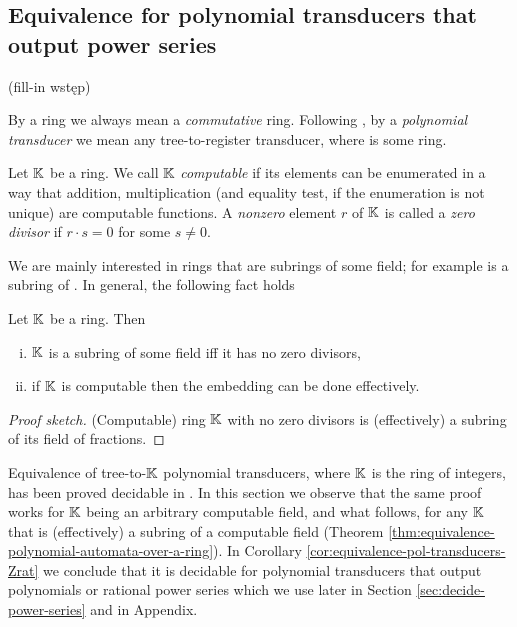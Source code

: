 \subsection{Equivalence for polynomial transducers that output power series}\label{sec:pol-transducers-any-ring}
(fill-in wstęp)

By a ring we always mean a \emph{commutative} ring.  Following \cite{seidlManethKemper2018}, by a \emph{polynomial transducer} we mean any tree-to-\Ring register transducer, where \Ring is some ring.

Let ${\mathbb K}$ be a ring. We call ${\mathbb K}$ \emph{computable} if its elements can be enumerated in a way that addition, multiplication (and equality test, if the enumeration is not unique) are computable functions. A \emph{nonzero} element $r$ of ${\mathbb K}$ is called a \emph{zero divisor} if $r \cdot s = 0$ for some $s \neq 0$.

We are mainly interested in rings that are subrings of some field;
for example \Z is a subring of \Q. In general, the following fact holds
\begin{lemma}\label{lem:ring-with-no-zero-divisors-subring-of-a-field}
	Let ${\mathbb K}$ be a ring. Then
	\begin{enumerate}[(i)]
		\item ${\mathbb K}$ is a subring of some field iff it has no zero divisors,
		\item if ${\mathbb K}$ is computable then the embedding can be done effectively.
	\end{enumerate}
\end{lemma}
\begin{proof}[Proof sketch]
	(Computable) ring ${\mathbb K}$ with no zero divisors is (effectively) a subring of its field of fractions.
\end{proof}


Equivalence of tree-to-${\mathbb K}$ polynomial transducers, where ${\mathbb K}$ is the ring of integers, has been proved decidable in \cite{seidlManethKemper2018}.
In this section we observe that the same proof works for ${\mathbb K}$ being an arbitrary computable field, and what follows, for any ${\mathbb K}$ that is (effectively) a subring of a computable field (Theorem \ref{thm:equivalence-polynomial-automata-over-a-ring}). In Corollary \ref{cor:equivalence-pol-transducers-Zrat} we conclude that it is decidable for polynomial transducers that output polynomials or rational power series which we use later in Section \ref{sec:decide-power-series} and in Appendix.


